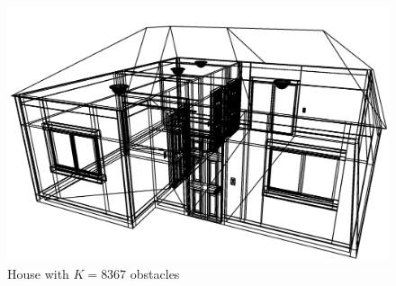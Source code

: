 \begin{figure}[H]
    \begin{center}
    \includegraphics[width=\textwidth]{figures/experiments/house.png}
    \end{center}
    \caption[House with $K=8367$ obstacles]{House with $K=8367$ obstacles}
    \label{fig:house}
\end{figure}
